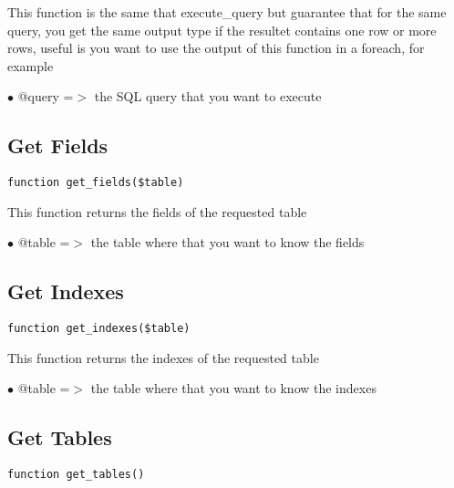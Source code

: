 \documentclass[a4paper]{book}
\begin{document}
This function is the same that execute\_query but guarantee that for the
same query, you get the same output type if the resultet contains one
row or more rows, useful is you want to use the output of this function
in a foreach, for example

\begin{compactitem}
\item[\color{myblue}$\bullet$] @query =$>$ the SQL query that you want to execute
\end{compactitem}

\hypertarget{toc250}{}
\subsection{Get Fields}

\begin{lstlisting}
function get_fields($table)
\end{lstlisting}

This function returns the fields of the requested table

\begin{compactitem}
\item[\color{myblue}$\bullet$] @table =$>$ the table where that you want to know the fields
\end{compactitem}

\hypertarget{toc251}{}
\subsection{Get Indexes}

\begin{lstlisting}
function get_indexes($table)
\end{lstlisting}

This function returns the indexes of the requested table

\begin{compactitem}
\item[\color{myblue}$\bullet$] @table =$>$ the table where that you want to know the indexes
\end{compactitem}

\hypertarget{toc252}{}
\subsection{Get Tables}

\begin{lstlisting}
function get_tables()
\end{lstlisting}
\end{document}
